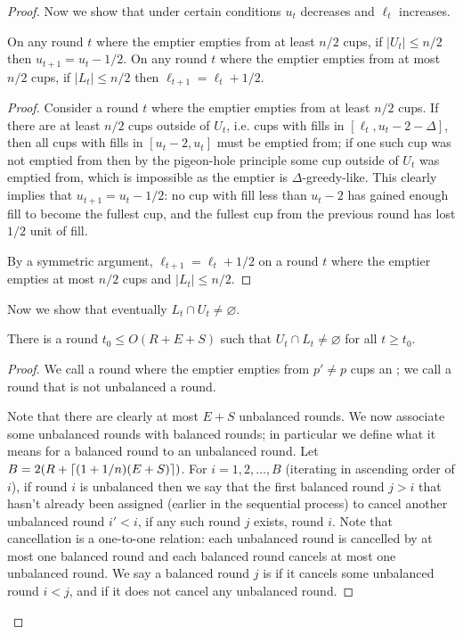 \begin{proof}
  Now we show that under certain conditions $u_t$ decreases and
  $\ell_t$ increases.
  \begin{clm}
    \label{clm:howDoLandUchange}
    On any round $t$ where the emptier empties from at least
    $n/2$ cups, if $|U_t| \le n/2$ then $u_{t+1} = u_t - 1/2$.
    On any round $t$ where the emptier empties from at most $n/2$
    cups, if $|L_t| \le n/2$ then $\ell_{t+1} = \ell_t + 1/2$.
  \end{clm}
  \begin{proof}
    Consider a round $t$ where the emptier empties from at least
    $n/2$ cups. If there are at least $n/2$ cups outside of
    $U_t$, i.e. cups with fills in $[\ell_t, u_t-2-\Delta]$, then
    all cups with fills in $[u_t - 2, u_t]$ must be emptied from;
    if one such cup was not emptied from then by the pigeon-hole
    principle some cup outside of $U_t$ was emptied from, which
    is impossible as the emptier is $\Delta$-greedy-like. This
    clearly implies that $u_{t+1} = u_t - 1/2$: no cup with fill
    less than $u_t-2$ has gained enough fill to become the
    fullest cup, and the fullest cup from the previous round has
    lost $1/2$ unit of fill.

    By a symmetric argument, $\ell_{t+1} = \ell_{t} + 1/2$ on a
    round $t$ where the emptier empties at most $n/2$ cups and
    $|L_t| \le n/2$. 
  \end{proof}

  Now we show that eventually $L_t \cap U_t \neq \varnothing$.
  \begin{clm}
    There is a round $t_0 \le O(R + E + S)$ such that $U_{t}
    \cap L_{t} \neq \varnothing$ for all $t\ge t_0$.
  \end{clm}
  \begin{proof}
  We call a round where the emptier empties from $p' \neq p$ cups
  an ; we call a round that is not
  unbalanced a  round. 

  Note that there are clearly at most $E+S$ unbalanced rounds.
  We now associate some unbalanced rounds with balanced rounds;
  in particular we define what it means for a balanced round to
   an unbalanced round. 
  Let $B = 2(R + \left\lceil (1+1/n)(E+S) \right\rceil)$. For $i = 1,2,\ldots,B$ 
  (iterating in ascending order of $i$), if round $i$
  is unbalanced then we say that the first balanced round $j > i$
  that hasn't already been assigned (earlier in the sequential
  process) to cancel another unbalanced round $i' < i$, if any
  such round $j$ exists,  round $i$. Note that
  cancellation is a one-to-one relation: each unbalanced round is
  cancelled by at most one balanced round and each balanced round
  cancels at most one unbalanced round. We say a balanced round
  $j$ is  if it cancels some unbalanced round $i
  < j$, and  if it does not cancel any
  unbalanced round.


\end{proof}
\end{proof}
